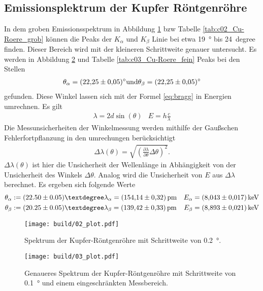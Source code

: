 \subsection{Emissionsplektrum der Kupfer Röntgenröhre}
In dem groben Emissionsspektrum in Abbildung \ref{fig:02} bzw Tabelle \ref{tab:c02_Cu-Roere_grob} können die
Peaks der $K_\alpha$ und $K_\beta$ Linie bei etwa \qty{19}{\degree} bis
\qty{24}{degree} finden.
Dieser Bereich wird mit der kleineren Schrittweite genauer untersucht.
Es werden in Abbildung \ref{fig:03} und Tabelle \ref{tab:c03_Cu-Roere_fein} Peaks bei den Stellen 
\begin{align}
    \theta_\alpha = \qty{22.25 \pm 0.05}{\degree} \text{und}
    \theta_\beta = \qty{22.25 \pm 0.05}{\degree}
\end{align}
gefunden.
Diese Winkel lassen sich mit der Formel \eqref{eq:bragg} in Energien umrechnen.
Es gilt
\begin{align*}
    \lambda = 2 d \sin(\theta) & E = h \frac{c}{\lambda}
\end{align*}
Die Messunsicherheiten der Winkelmessung werden mithilfe der Gaußschen Fehlerfortpflanzung in den umrechungen berücksichtigt
\begin{align}
    \Delta \lambda(\theta) = \sqrt{
    \left(\frac{\partial \lambda}{\partial \theta} \Delta \theta \right)^2 }.
    \label{eq:gauss}
\end{align}
$\Delta \lambda(\theta)$ ist hier die Unsicherheit der Wellenlänge in Abhängigkeit von der Unsicherheit des Winkels $\Delta \theta$.
Analog wird die Unsicherheit von $E$ aus $\Delta \lambda$ berechnet.
Es ergeben sich folgende Werte 
\begin{align*}
    \theta_\alpha: = (22.50 \pm 0.05)° & \lambda_\alpha = \qty{154.14 \pm 0.32}{\pico\meter}  & E_\alpha = \qty{8.043 \pm 0.017}{\kilo\eV}  \\
    \theta_\beta:  = (20.25 \pm 0.05)° & \lambda_\beta  = \qty{139.42 \pm 0.33}{\pico\meter}  & E_\beta  = \qty{8.893 \pm 0.021}{\kilo\eV}  \\ 
\end{align*}

\begin{figure}
    \centering
    \texttt{[image: build/02\_plot.pdf]}
    \caption{Spektrum der Kupfer-Röntgenröhre mit Schrittweite von \qty{0.2}{\degree}.}
    \label{fig:02}
\end{figure}
\begin{figure}
    \centering
    \texttt{[image: build/03\_plot.pdf]}
    \caption{Genaueres Spektrum der Kupfer-Röntgenröhre mit Schrittweite von \qty{0.1}{\degree} und einem eingeschränkten Messbereich.}
    \label{fig:03}
\end{figure}




